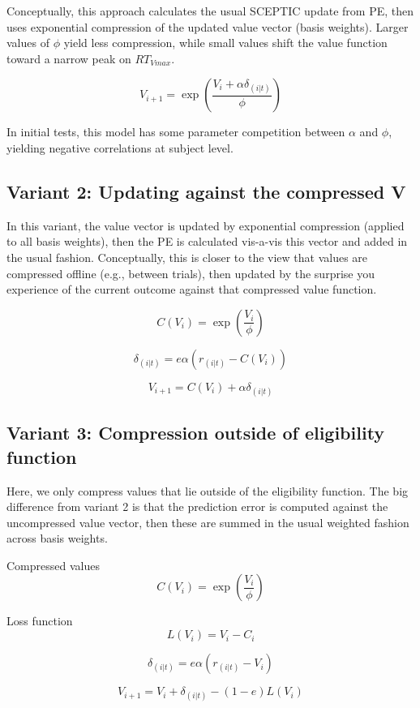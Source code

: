 \documentclass[12pt]{article}
\begin{document}
Conceptually, this approach calculates the usual SCEPTIC update from PE, then uses exponential compression of the updated value vector (basis weights).
Larger values of $\phi$ yield less compression, while small values shift the value function toward a narrow peak on $RT_{Vmax}$.

\begin{equation}
V_{i+1} = \exp(\frac{V_i + \alpha \delta_{(i | t)}}{\phi})
\end{equation}

In initial tests, this model has some parameter competition between $\alpha$ and $\phi$, yielding negative correlations at subject level.

\subsection{Variant 2: Updating against the compressed V}

In this variant, the value vector is updated by exponential compression (applied to all basis weights), then the PE is calculated vis-a-vis this vector and added in the usual fashion.
Conceptually, this is closer to the view that values are compressed offline (e.g., between trials), then updated by the surprise you experience of the current outcome against that compressed value function.

\begin{equation}
C(V_i) =  \exp(\frac{V_i}{\phi})
\end{equation}

\begin{equation}
\delta_{(i | t)} = e \alpha( r_{(i | t)} - C(V_i))
\end{equation}

\begin{equation}
V_{i+1} =  C(V_i) + \alpha \delta_{(i | t)}
\end{equation}

\subsection{Variant 3: Compression outside of eligibility function}

Here, we only compress values that lie outside of the eligibility function. The big difference from variant 2 is that the prediction error is computed against the uncompressed value vector, then these are summed in the usual weighted fashion across basis weights.

Compressed values
\begin{equation}
C(V_i) =  \exp(\frac{V_i}{\phi})
\end{equation}

Loss function
\begin{equation}
L(V_i) =  V_i - C_i
\end{equation}

\begin{equation}
\delta_{(i | t)} = e \alpha( r_{(i | t)} - V_i)
\end{equation}

\begin{equation}
V_{i+1} =  V_i + \delta_{(i | t)} - (1-e) L(V_i)
\end{equation}
\end{document}
